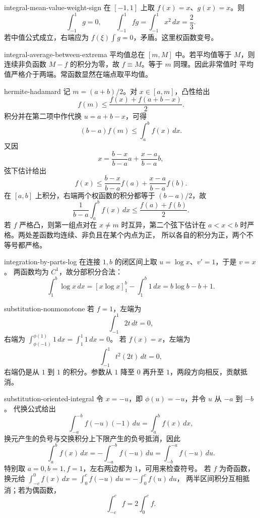\begin{solution}{integral-mean-value-weight-sign}
在 \([-1,1]\) 上取 \(f(x)=x\)、\(g(x)=x\)。则
\[
 \int_{-1}^1g=0,\qquad
 \int_{-1}^1fg=\int_{-1}^1x^2\,dx=\frac23.
\]
若中值公式成立，右端应为 \(f(\xi)\int g=0\)，矛盾。这里权函数变号。
\end{solution}

\begin{solution}{integral-average-between-extrema}
平均值总在 \([m,M]\) 中。若平均值等于 \(M\)，则连续非负函数
\(M-f\) 的积分为零，故 \(f\equiv M\)。等于 \(m\) 同理。因此非常值时
平均值严格介于两端。常函数显然在端点取平均值。
\end{solution}

\begin{solution}{hermite-hadamard}
记 \(m=(a+b)/2\)。对 \(x\in[a,m]\)，凸性给出
\[
 f(m)\le\frac{f(x)+f(a+b-x)}2.
\]
积分并在第二项中作代换 \(u=a+b-x\)，可得
\[
 (b-a)f(m)\le\int_a^b f(x)\,dx.
\]
又因
\[
 x=\frac{b-x}{b-a}a+\frac{x-a}{b-a}b,
\]
弦下估计给出
\[
 f(x)\le\frac{b-x}{b-a}f(a)+\frac{x-a}{b-a}f(b).
\]
在 \([a,b]\) 上积分，右端两个权函数的积分都等于 \((b-a)/2\)，故
\[
 \frac1{b-a}\int_a^bf(x)\,dx\le\frac{f(a)+f(b)}2.
\]
若 \(f\) 严格凸，则第一组点对在 \(x\ne m\) 时互异，第二个弦下估计在
\(a<x<b\) 时严格。两处差函数均连续、非负且在某个内点为正，
所以各自的积分为正，两个不等号都严格。
\end{solution}

\begin{solution}{integration-by-parts-log}
在连接 \(1,b\) 的闭区间上取 \(u=\log x\)、\(v'=1\)，于是 \(v=x\)。
两函数均为 \(C^1\)，故分部积分合法：
\[
 \int_1^b\log x\,dx
 =[x\log x]_1^b-\int_1^b1\,dx
 =b\log b-b+1.
\]
\end{solution}

\begin{solution}{substitution-nonmonotone}
若 \(f=1\)，左端为
\[
 \int_{-1}^1 2t\,dt=0,
\]
右端为 \(\int_{\phi(-1)}^{\phi(1)}1\,dx=\int_1^1 1\,dx=0\)。
若 \(f(x)=x\)，左端为
\[
 \int_{-1}^1 t^2(2t)\,dt=0,
\]
右端仍是从 \(1\) 到 \(1\) 的积分。参数从 \(1\) 降至 \(0\) 再升至
\(1\)，两段方向相反，贡献抵消。
\end{solution}

\begin{solution}{substitution-oriented-integral}
令 \(x=-u\)，即 \(\phi(u)=-u\)，并令 \(u\) 从 \(-a\) 到 \(-b\)。
代换公式给出
\[
 \int_{-a}^{-b}f(-u)(-1)\,du=\int_a^b f(x)\,dx,
\]
换元产生的负号与交换积分上下限产生的负号抵消，因此
\[
 \int_a^b f(x)\,dx
 =-\int_{-a}^{-b}f(-u)\,du
 =\int_{-b}^{-a}f(-u)\,du.
\]
特别取 \(a=0,b=1,f=1\)，左右两边都为 \(1\)，可用来检查符号。
若 \(f\) 为奇函数，换元给
\(\int_{-c}^0f(x)\,dx=\int_0^cf(-u)\,du=-\int_0^cf(u)\,du\)，
两半区间积分互相抵消；若为偶函数，
\[
 \int_{-c}^c f=2\int_0^c f.
\]
\end{solution}

